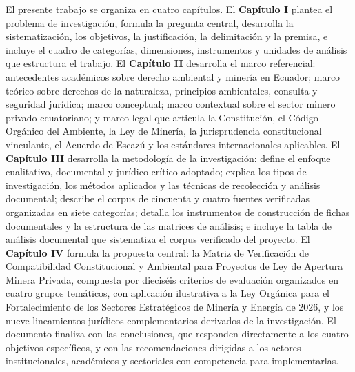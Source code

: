 El presente trabajo se organiza en cuatro capítulos. El \textbf{Capítulo I} plantea el problema de investigación, formula la pregunta central, desarrolla la sistematización, los objetivos, la justificación, la delimitación y la premisa, e incluye el cuadro de categorías, dimensiones, instrumentos y unidades de análisis que estructura el trabajo. El \textbf{Capítulo II} desarrolla el marco referencial: antecedentes académicos sobre derecho ambiental y minería en Ecuador; marco teórico sobre derechos de la naturaleza, principios ambientales, consulta y seguridad jurídica; marco conceptual; marco contextual sobre el sector minero privado ecuatoriano; y marco legal que articula la Constitución, el Código Orgánico del Ambiente, la Ley de Minería, la jurisprudencia constitucional vinculante, el Acuerdo de Escazú y los estándares internacionales aplicables. El \textbf{Capítulo III} desarrolla la metodología de la investigación: define el enfoque cualitativo, documental y jurídico-crítico adoptado; explica los tipos de investigación, los métodos aplicados y las técnicas de recolección y análisis documental; describe el corpus de cincuenta y cuatro fuentes verificadas organizadas en siete categorías; detalla los instrumentos de construcción de fichas documentales y la estructura de las matrices de análisis; e incluye la tabla de análisis documental que sistematiza el corpus verificado del proyecto. El \textbf{Capítulo IV} formula la propuesta central: la Matriz de Verificación de Compatibilidad Constitucional y Ambiental para Proyectos de Ley de Apertura Minera Privada, compuesta por dieciséis criterios de evaluación organizados en cuatro grupos temáticos, con aplicación ilustrativa a la Ley Orgánica para el Fortalecimiento de los Sectores Estratégicos de Minería y Energía de 2026, y los nueve lineamientos jurídicos complementarios derivados de la investigación. El documento finaliza con las conclusiones, que responden directamente a los cuatro objetivos específicos, y con las recomendaciones dirigidas a los actores institucionales, académicos y sectoriales con competencia para implementarlas.

